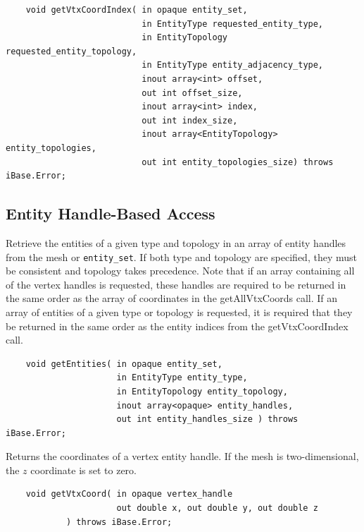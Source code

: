 \documentclass{article}
\begin{document}
\begin{verbatim}
    void getVtxCoordIndex( in opaque entity_set, 
                           in EntityType requested_entity_type,  
                           in EntityTopology requested_entity_topology, 
                           in EntityType entity_adjacency_type, 
                           inout array<int> offset, 
                           out int offset_size, 
                           inout array<int> index, 
                           out int index_size, 
                           inout array<EntityTopology> entity_topologies, 
                           out int entity_topologies_size) throws iBase.Error;
\end{verbatim}

\subsection{Entity Handle-Based Access}

Retrieve the entities of a given type and topology in an array 
of entity handles from the mesh or {\tt entity\_set}. If both type 
and topology are specified, they must be consistent and topology 
takes precedence. Note that if an array containing all of the 
vertex handles is requested, these handles are required to be 
returned in the same order as the array of coordinates in the 
getAllVtxCoords call. If an array of entities of a given type 
or topology is requested, it is required that they be returned 
in the same order as the entity indices from the getVtxCoordIndex 
call.

\begin{verbatim}
    void getEntities( in opaque entity_set,  
                      in EntityType entity_type,  
                      in EntityTopology entity_topology, 
                      inout array<opaque> entity_handles,  
                      out int entity_handles_size ) throws iBase.Error;
\end{verbatim}

Returns the coordinates of a vertex entity handle. If the mesh 
is two-dimensional, the $z$ coordinate is set to zero.

\begin{verbatim}
    void getVtxCoord( in opaque vertex_handle
                      out double x, out double y, out double z
		    ) throws iBase.Error;
\end{verbatim}
\end{document}
